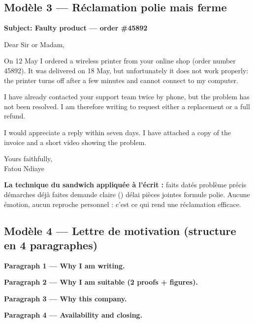 \subsection{Modèle 3 --- Réclamation polie mais ferme}
\begin{dialoguebox}
\begin{anglais}
\textbf{Subject: Faulty product --- order \#45892}

Dear Sir or Madam,

On 12 May I ordered a wireless printer from your online shop (order number 45892). It was
delivered on 18 May, but unfortunately it does not work properly: the printer turns off after
a few minutes and cannot connect to my computer.

I have already contacted your support team twice by phone, but the problem has not been
resolved. I am therefore writing to request either a replacement or a full refund.

I would appreciate a reply within seven days. I have attached a copy of the invoice and a
short video showing the problem.

Yours faithfully,\\
Fatou Ndiaye
\end{anglais}
\end{dialoguebox}
\textbf{La technique du sandwich appliquée à l'écrit :} faits datés \ra problème précis
\ra démarches déjà faites \ra demande claire () \ra délai
\ra pièces jointes \ra formule polie. Aucune émotion, aucun reproche personnel : c'est ce
qui rend une réclamation efficace.

\subsection{Modèle 4 --- Lettre de motivation (structure en 4 paragraphes)}
\begin{dialoguebox}
\begin{anglais}
\textbf{Paragraph 1 --- Why I am writing.}\\

\textbf{Paragraph 2 --- Why I am suitable (2 proofs + figures).}\\

\textbf{Paragraph 3 --- Why this company.}\\

\textbf{Paragraph 4 --- Availability and closing.}\\
\end{anglais}
\end{dialoguebox}

